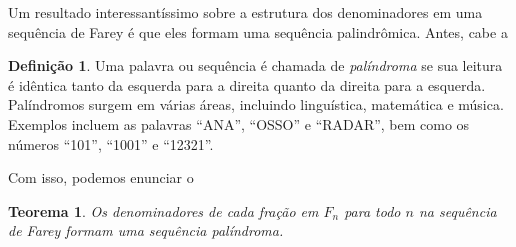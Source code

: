 \documentclass{hipatia}
\newtheorem*{theorem*}{Teorema}
\theoremstyle{definition} %
\newtheorem*{definition*}{Definição} %
\begin{document}
Um resultado interessantíssimo sobre a estrutura dos denominadores em uma sequência de Farey é que eles formam uma sequência palindrômica. Antes, cabe a

\begin{definition*}
    Uma palavra ou sequência é chamada de \textit{palíndroma} se sua leitura é idêntica tanto da esquerda para a direita quanto da direita para a esquerda. Palíndromos surgem em várias áreas, incluindo linguística, matemática e música. Exemplos incluem as palavras ``ANA'', ``OSSO'' e ``RADAR'', bem como os números ``101'', ``1001'' e ``12321''.
\end{definition*}

Com isso, podemos enunciar o


\begin{theorem*}
      Os denominadores de cada fração em \(F_{n}\) para todo \(n\) na sequência de Farey formam uma sequência palíndroma.
\end{theorem*}
    
\end{document}
